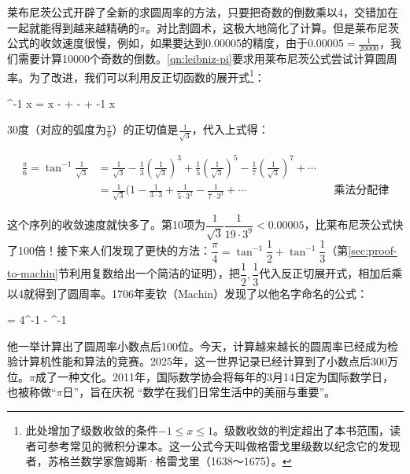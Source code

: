 \documentclass[b5paper]{ctexart}
\begin{document}
莱布尼茨公式开辟了全新的求圆周率的方法，只要把奇数的倒数乘以4，交错加在一起就能得到越来越精确的$\pi$。对比割圆术，这极大地简化了计算。但是莱布尼茨公式的收敛速度很慢，例如，如果要达到0.00005的精度，由于$0.00005 = \frac{1}{20000}$，我们需要计算10000个奇数的倒数。\cref{qn:leibniz-pi}要求用莱布尼茨公式尝试计算圆周率。为了改进，我们可以利用反正切函数的展开式\footnote{此处增加了级数收敛的条件$-1 \leq x \leq 1$。级数收敛的判定超出了本书范围，读者可参考常见的微积分课本。这一公式今天叫做格雷戈里级数以纪念它的发现者，苏格兰数学家詹姆斯·格雷戈里（1638～1675）。}：

\be
\tan^{-1} x = x -  +  -  + \dotsb \quad {} -1 \leq x 
\ee

30度（对应的弧度为$\frac{\pi}{6}$）的正切值是$\frac{1}{\sqrt{3}}$，代入上式得：

\begin{align*}
\frac{\pi}{6} = \tan^{-1} \frac{1}{\sqrt{3}} &= \frac{1}{\sqrt{3}} - \frac{1}{3}(\frac{1}{\sqrt{3}})^3 + \frac{1}{5}(\frac{1}{\sqrt{3}})^5 - \frac{1}{7}(\frac{1}{\sqrt{3}})^7 + \dotsb \\
  &= \frac{1}{\sqrt{3}}(1 - \frac{1}{3 \cdot 3} + \frac{1}{5 \cdot 3^2} - \frac{1}{7 \cdot 3^3} + \dotsb && \text{乘法分配律}
\end{align*}

\label{sec:machin-formula}
这个序列的收敛速度就快多了。第10项为$\dfrac{1}{\sqrt{3}}\dfrac{1}{19 \cdot 3^9} < 0.00005$，比莱布尼茨公式快了100倍！接下来人们发现了更快的方法：$\dfrac{\pi}{4} = \tan^{-1} \dfrac{1}{2} + \tan^{-1} \dfrac{1}{3}$（第\ref{sec:proof-to-machin}节利用复数给出一个简洁的证明），把$\dfrac{1}{2}, \dfrac{1}{3}$代入反正切展开式，相加后乘以4就得到了圆周率。1706年麦钦（Machin）发现了以他名字命名的公式\cite{Chronology-pi-2000}：


\be
{} = 4\tan^{-1}  - \tan^{-1} 
\ee

他一举计算出了圆周率小数点后100位。今天，计算越来越长的圆周率已经成为检验计算机性能和算法的竞赛。2025年，这一世界记录已经计算到了小数点后300万位。$\pi$成了一种文化。2011年，国际数学协会将每年的3月14日定为国际数学日，也被称做“$\pi$日”，旨在庆祝 “数学在我们日常生活中的美丽与重要”。
\end{document}
